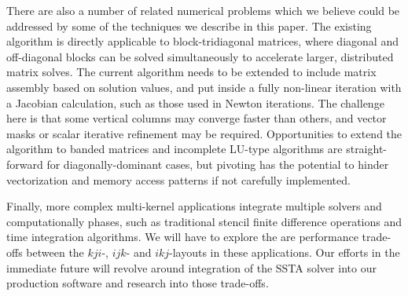 \documentclass{sig-alternate-05-2015}
\begin{document}
There are also a number of related numerical problems which we believe could be
  addressed by some of the techniques we describe in this paper.
The existing algorithm is directly applicable to block-tridiagonal matrices,
  where diagonal and off-diagonal blocks can be solved simultaneously
  to accelerate larger, distributed matrix solves.
The current algorithm needs to be extended to include matrix assembly
  based on solution values, and put inside a fully non-linear iteration
  with a Jacobian calculation, such as those used in Newton iterations.
The challenge here is that some vertical columns may converge faster than
  others, and vector masks or scalar iterative refinement may be required.
Opportunities to extend the algorithm to banded matrices and incomplete LU-type 
  algorithms are straight-forward for diagonally-dominant cases, but
  pivoting has the potential to hinder vectorization and memory access patterns
  if not carefully implemented.

Finally, more complex multi-kernel applications integrate multiple solvers and
  computationally phases, such as traditional stencil finite difference
  operations and time integration algorithms. 
We will have to explore the are performance trade-offs between
  the \(kji\)-, \(ijk\)- and \(ikj\)-layouts in these applications.
Our efforts in the immediate future will revolve around integration of the SSTA
  solver into our production software and research into those trade-offs.

%
\end{document}
